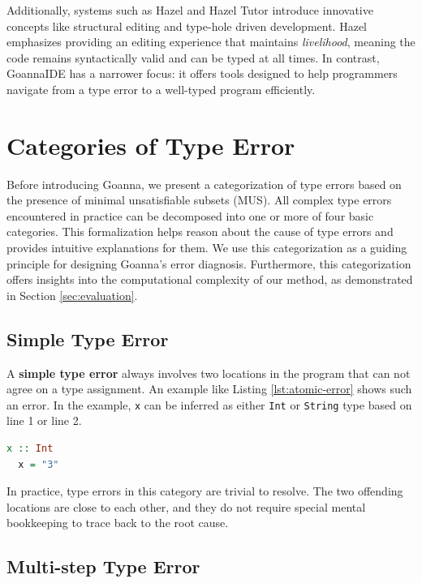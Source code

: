 \documentclass[pdflatex,lineno,sn-nature,Numbered]{sn-jnl}%
\begin{document}
Additionally, systems such as Hazel \cite{Zhao2024-qd} and Hazel Tutor \cite{Potter2020-tv} introduce innovative concepts like structural editing and type-hole driven development. Hazel emphasizes providing an editing experience that maintains {\it livelihood}, meaning the code remains syntactically valid and can be typed at all times. In contrast, GoannaIDE has a narrower focus: it offers tools designed to help programmers navigate from a type error to a well-typed program efficiently.

\section{Categories of Type Error} \label{sec:categories}

Before introducing Goanna, we present a categorization of type errors based on the presence of minimal unsatisfiable subsets (MUS). All complex type errors encountered in practice can be decomposed into one or more of four basic categories. This formalization helps reason about the cause of type errors and provides intuitive explanations for them. We use this categorization as a guiding principle for designing Goanna's error diagnosis. Furthermore, this categorization offers insights into the computational complexity of our method, as demonstrated in Section \ref{sec:evaluation}.

\subsection{Simple Type Error}
A \textbf{simple type error} always involves two locations in the program that can not agree on a type assignment. An example like Listing \ref{lst:atomic-error} shows such an error. In the example, {\tt x} can be inferred as either {\tt Int} or {\tt String} type based on line 1 or line 2. 

\begin{lstlisting}[language=Haskell, caption=An example of a simple type error, label={lst:atomic-error}]
  x :: Int
  x = "3"
\end{lstlisting}

In practice, type errors in this category are trivial to resolve. The two offending locations are close to each other, and they do not require special mental bookkeeping to trace back to the root cause. 

\subsection{Multi-step Type Error} \label{sec:multi-step}
\end{document}
